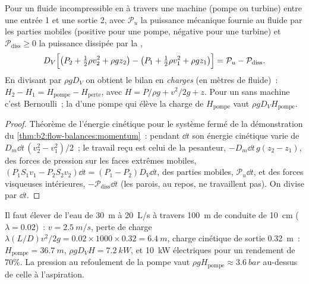 \begin{theorem}\label{thm:b2:flow-balances:energy}
Pour un fluide incompressible en  à travers une machine (pompe ou
turbine) entre une entrée 1 et une sortie 2, avec $\mathcal P_u$ la
puissance mécanique fournie au fluide par les parties mobiles (positive pour une
pompe, négative pour une turbine) et $\mathcal P_{\text{diss}} \ge 0$ la puissance
dissipée par la ,
\[
D_V\Bigl[\bigl(P_2 + \tfrac12\rho v_2^2 + \rho gz_2\bigr) - \bigl(P_1 + \tfrac12\rho v_1^2
+ \rho gz_1\bigr)\Bigr] = \mathcal P_u - \mathcal P_{\text{diss}} .
\]
En divisant par $\rho gD_V$ on obtient le bilan en \emph{charges} (en mètres de
fluide)~: $H_2 - H_1 = H_{\text{pompe}} - H_{\text{perte}}$, avec $H = P/\rho g +
v^2/2g + z$. Pour un  sans machine c'est Bernoulli~; la
\emph{} d'une pompe qui élève la charge de $H_{\text{pompe}}$ vaut
$\rho gD_VH_{\text{pompe}}$.
\end{theorem}

\begin{proof}
Théorème de l'énergie cinétique pour le système fermé de la démonstration du
\cref{thm:b2:flow-balances:momentum}~: pendant $\dd t$ son énergie cinétique
varie de $D_m\dd t\,(v_2^2 - v_1^2)/2$~; le travail reçu est celui de
la pesanteur, $-D_m\dd t\,g(z_2 - z_1)$, des forces de pression sur les faces
extrêmes mobiles, $(P_1S_1v_1 - P_2S_2v_2)\dd t = (P_1 - P_2)D_V\dd t$, des
parties mobiles, $\mathcal P_u\dd t$, et des forces visqueuses intérieures,
$-\mathcal P_{\text{diss}}\dd t$ (les parois, au repos, ne travaillent pas). On divise par
$\dd t$.
\end{proof}

\begin{example}\label{ex:b2:flow-balances:pump}
Il faut élever de l'eau de \qty{30}{m} à \qty{20}{L/s} à travers \qty{100}{m} de
conduite de \qty{10}{cm} ($\lambda = 0.02$)~: $v = \qty{2.5}{m/s}$, perte de charge $\lambda(L/D)
v^2/2g = 0.02 \times 1000 \times 0.32 = \qty{6.4}{m}$, charge cinétique de sortie
\qty{0.32}{m}~: $H_{\text{pompe}} = \qty{36.7}{m}$,  $\rho gD_VH =
\qty{7.2}{kW}$, et \qty{10}{kW} électriques pour un rendement de $70\%$. La
pression au refoulement de la pompe vaut $\rho gH_{\text{pompe}} \approx \qty{3.6}{bar}$ au-dessus
de celle à l'aspiration.
\end{example}

